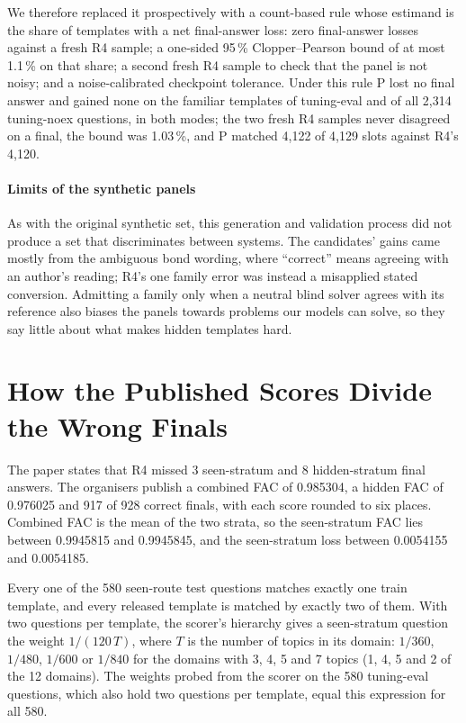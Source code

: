 \documentclass[conference]{IEEEtran}
\begin{document}
We therefore replaced it prospectively with a count-based rule whose estimand is the share of templates with a net final-answer loss: zero final-answer losses against a fresh R4 sample; a one-sided 95\,\% Clopper--Pearson bound of at most 1.1\,\% on that share; a second fresh R4 sample to check that the panel is not noisy; and a noise-calibrated checkpoint tolerance. Under this rule P lost no final answer and gained none on the familiar templates of tuning-eval and of all 2,314 tuning-noex questions, in both modes; the two fresh R4 samples never disagreed on a final, the bound was 1.03\,\%, and P matched 4,122 of 4,129 slots against R4's 4,120.

\paragraph*{Limits of the synthetic panels} As with the original synthetic set, this generation and validation process did not produce a set that discriminates between systems. The candidates' gains came mostly from the ambiguous bond wording, where ``correct'' means agreeing with an author's reading; R4's one family error was instead a misapplied stated conversion. Admitting a family only when a neutral blind solver agrees with its reference also biases the panels towards problems our models can solve, so they say little about what makes hidden templates hard.

\section{How the Published Scores Divide the Wrong Finals}\label{sec:split}
The paper states that R4 missed 3 seen-stratum and 8 hidden-stratum final answers. The organisers publish a combined FAC of 0.985304, a hidden FAC of 0.976025 and 917 of 928 correct finals, with each score rounded to six places. Combined FAC is the mean of the two strata, so the seen-stratum FAC lies between 0.9945815 and 0.9945845, and the seen-stratum loss between 0.0054155 and 0.0054185.

Every one of the 580 seen-route test questions matches exactly one train template, and every released template is matched by exactly two of them. With two questions per template, the scorer's hierarchy gives a seen-stratum question the weight $1/(120\,T)$, where $T$ is the number of topics in its domain: $1/360$, $1/480$, $1/600$ or $1/840$ for the domains with 3, 4, 5 and 7 topics (1, 4, 5 and 2 of the 12 domains). The weights probed from the scorer on the 580 tuning-eval questions, which also hold two questions per template, equal this expression for all 580.
\end{document}
